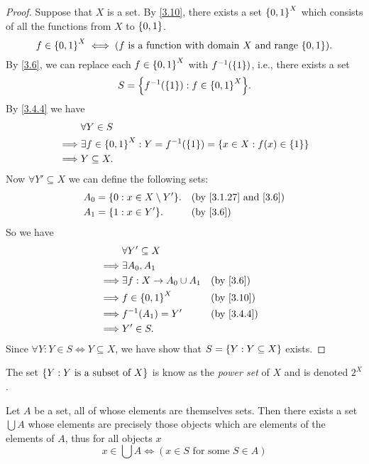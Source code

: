 \begin{proof}
	Suppose that \(X\) is a set.
	By \cref{3.10}, there exists a set \(\left\lbrace0, 1\right\rbrace^X\) which consists of all the functions from \(X\) to \(\left\lbrace0, 1\right\rbrace\).
	\[
		f \in \set{0, 1}^X \iff (f \text{ is a function with domain } X \text{ and range } \set{0, 1}).
	\]
	By \cref{3.6}, we can replace each \(f \in \left\lbrace0, 1\right\rbrace^X\) with \(f^{-1}(\left\lbrace1\right\rbrace)\), i.e., there exists a set
	\[
		S = \set{f^{-1}(\set{1}) : f \in \set{0, 1}^X}.
	\]
	By \cref{3.4.4} we have
	\begin{align*}
		         & \forall Y \in S                                                                     \\
		\implies & \exists f \in \left\lbrace0, 1\right\rbrace^X : Y = f^{-1}(\left\lbrace1\right\rbrace) = \left\lbrace x \in X : f(x) \in \left\lbrace1\right\rbrace\right\rbrace \\
		\implies & Y \subseteq X.
	\end{align*}
	Now \(\forall Y' \subseteq X\) we can define the following sets:
	\begin{align*}
		A_0 & = \set{0 : x \in X \setminus Y'}. &  & \text{(by \cref{3.1.27} and \cref{3.6})} \\
		A_1 & = \set{1 : x \in Y'}.             &  & \by{3.6}
	\end{align*}
	So we have
	\begin{align*}
		         & \forall Y' \subseteq X                         \\
		\implies & \exists A_0, A_1                               \\
		\implies & \exists f : X \to A_0 \cup A_1 &  & \by{3.6}   \\
		\implies & f \in \set{0, 1}^X             &  & \by{3.10}  \\
		\implies & f^{-1}(A_1) = Y'               &  & \by{3.4.4} \\
		\implies & Y' \in S.
	\end{align*}
	Since \(\forall Y : Y \in S \iff Y \subseteq X\), we have show that \(S = \left\lbrace Y : Y \subseteq X\right\rbrace\) exists.
\end{proof}

\begin{rmk}\label{3.4.10}
	The set \(\left\lbrace Y : Y \text{ is a subset of } X\right\rbrace\) is know as the \emph{power set} of \(X\) and is denoted \(2^X\).
\end{rmk}

\begin{ax}[Union]\label{3.11}
	Let \(A\) be a set, all of whose elements are themselves sets.
	Then there exists a set \(\bigcup A\) whose elements are precisely those objects which are elements of the elements of \(A\), thus for all objects \(x\)
	\[
		x \in \bigcup A \iff (x \in S \text{ for some } S \in A)
	\]
\end{ax}

